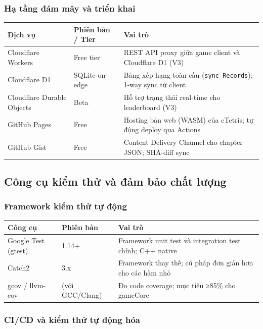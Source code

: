 \documentclass[12pt,a4paper]{article}
\begin{document}
\subsubsection{Hạ tầng đám mây và triển khai}

\begin{tabularx}{\linewidth}{|l|l|X|}
\hline
\rowcolor{gray!20}
\textbf{Dịch vụ} & \textbf{Phiên bản / Tier} & \textbf{Vai trò} \\
\hline
Cloudflare Workers & Free tier & REST API proxy giữa game client và Cloudflare D1 (V3) \\
\hline
Cloudflare D1 & SQLite-on-edge & Bảng xếp hạng toàn cầu (\texttt{sync\_Records}); 1-way sync từ client \\
\hline
Cloudflare Durable Objects & Beta & Hỗ trợ trạng thái real-time cho leaderboard (V3) \\
\hline
GitHub Pages & Free & Hosting bản web (WASM) của cTetris; tự động deploy qua Actions \\
\hline
GitHub Gist & Free & Content Delivery Channel cho chapter JSON; SHA-diff sync \\
\hline
\end{tabularx}

\subsection{Công cụ kiểm thử và đảm bảo chất lượng}

\subsubsection{Framework kiểm thử tự động}

\begin{tabularx}{\linewidth}{|l|l|X|}
\hline
\rowcolor{gray!20}
\textbf{Công cụ} & \textbf{Phiên bản} & \textbf{Vai trò} \\
\hline
Google Test (gtest) & 1.14+ & Framework unit test và integration test chính; C++ native \\
\hline
Catch2 & 3.x & Framework thay thế; cú pháp đơn giản hơn cho các hàm nhỏ \\
\hline
gcov / llvm-cov & (với GCC/Clang) & Đo code coverage; mục tiêu ≥85\% cho gameCore \\
\hline
\end{tabularx}

\subsubsection{CI/CD và kiểm thử tự động hóa}
\end{document}
